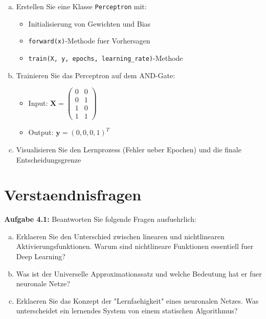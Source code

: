 ﻿\documentclass[12pt,a4paper]{article}
\begin{document}
\begin{enumerate}[(a)]
    \item Erstellen Sie eine Klasse \texttt{Perceptron} mit:
    \begin{itemize}
        \item Initialisierung von Gewichten und Bias
        \item \texttt{forward(x)}-Methode fuer Vorhersagen
        \item \texttt{train(X, y, epochs, learning\_rate)}-Methode
    \end{itemize}
    
    \item Trainieren Sie das Perceptron auf dem AND-Gate:
    \begin{itemize}
        \item Input: $\mathbf{X} = \begin{pmatrix} 0 & 0 \\ 0 & 1 \\ 1 & 0 \\ 1 & 1 \end{pmatrix}$
        \item Output: $\mathbf{y} = (0, 0, 0, 1)^T$
    \end{itemize}
    
    \item Visualisieren Sie den Lernprozess (Fehler ueber Epochen) und die finale Entscheidungsgrenze
\end{enumerate}

\section{Verstaendnisfragen}

\textbf{Aufgabe 4.1:} Beantworten Sie folgende Fragen ausfuehrlich:

\begin{enumerate}[(a)]
    \item Erklaeren Sie den Unterschied zwischen linearen und nichtlinearen Aktivierungsfunktionen. Warum sind nichtlineare Funktionen essentiell fuer Deep Learning?
    
    \item Was ist der Universelle Approximationssatz und welche Bedeutung hat er fuer neuronale Netze?
    
    \item Erklaeren Sie das Konzept der "Lernfaehigkeit" eines neuronalen Netzes. Was unterscheidet ein lernendes System von einem statischen Algorithmus?
\end{enumerate}
\end{document}
